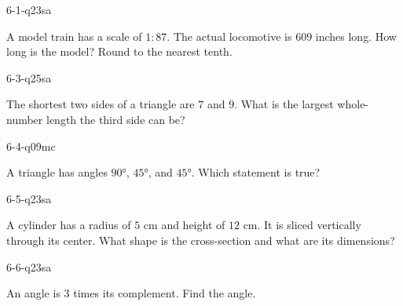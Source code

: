 \begin{practiceQuestion}{6-1-q23}{sa}
\begin{questionText}
A model train has a scale of $1:87$. The actual locomotive is $609$ inches long. How long is the model? Round to the nearest tenth.
\end{questionText}
\end{practiceQuestion}

\begin{practiceQuestion}{6-3-q25}{sa}
\begin{questionText}
The shortest two sides of a triangle are $7$ and $9$. What is the largest whole-number length the third side can be?
\end{questionText}
\end{practiceQuestion}

\begin{practiceQuestion}{6-4-q09}{mc}
\begin{questionText}
A triangle has angles $90°$, $45°$, and $45°$. Which statement is true?
\end{questionText}
\end{practiceQuestion}

\begin{practiceQuestion}{6-5-q23}{sa}
\begin{questionText}
A cylinder has a radius of $5$ cm and height of $12$ cm. It is sliced vertically through its center. What shape is the cross-section and what are its dimensions?
\end{questionText}
\end{practiceQuestion}

\begin{practiceQuestion}{6-6-q23}{sa}
\begin{questionText}
An angle is $3$ times its complement. Find the angle.
\end{questionText}
\end{practiceQuestion}

